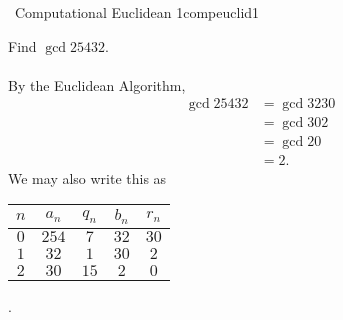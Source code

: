     \begin{exercise}{\Difficulty\,\Difficulty\,\,Computational Euclidean 1}{compeuclid1}
    
        Find \(\gcd{254}{32}\).
        \\
        \\
        By the Euclidean Algorithm,
        \begin{align*}
            \gcd{254}{32}&=\gcd{32}{30} \\
            &=\gcd{30}{2} \\
            &=\gcd{2}{0} \\
            &=2.
        \end{align*}
        We may also write this as
        \begin{center}
            \begin{tabular}{c|c|c|c|c}
                \hline
                \(n\) & \(a_n\) & \(q_n\) & \(b_n\) & \(r_n\) \\
                \hline
                \(0\) & \(254\) & \(7\) & \(32\) & \(30\) \\
                \(1\) & \(32\) & \(1\) & \(30\) & \(2\) \\
                \(2\) & \(30\) & \(15\) & \(2\) & \(0\) \\
                \hline
            \end{tabular}.
        \end{center}
        
    \end{exercise}
    
